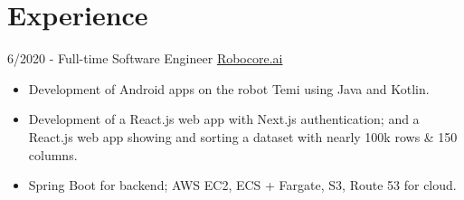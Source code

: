 \documentclass[letterpaper]{twentysecondcv} %
\begin{document}
\makeprofile %



\section{Experience}{\faAlignJustify}

\begin{twenty} %


\twentyitem
    	{6/2020 - }
	{}
         {Full-time Software Engineer}
         {\href{https://www.robocore.ai}{Robocore.ai}}
        {}
        {\vspace{-2mm}\begin{itemize}[topsep=0pt,partopsep=0pt]
				\item Development of Android apps on the robot Temi using Java and Kotlin.
				\item Development of a React.js web app with Next.js authentication; and a React.js web app showing and sorting a dataset with nearly 100k rows \& 150 columns.
				\item Spring Boot for backend; AWS EC2, ECS + Fargate, S3, Route 53 for cloud.
				\end{itemize} }\\


\end{twenty}
\end{document}
